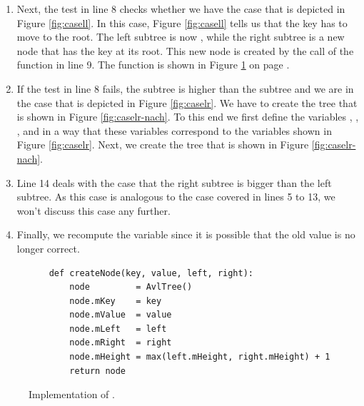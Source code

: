 \begin{enumerate}
      If the test in line 5 succeeds, then the left subtree must have a height that is bigger by
      two than the height of the right subtree.  In order to be able to use the same variable names 
      as the variable names given in the equations discussed in the previous subsection, we define
      the variables , , , , , , ,
      and  in lines 6 and 7 so that these variable names correspond exactly to the variable names
      used in the Figures \ref{fig:casell} and \ref{fig:caselr}.
\item Next, the test in line 8 checks whether we have the case that is depicted in Figure
      \ref{fig:casell}.  In this case, Figure \ref{fig:casell} tells us that the key 
      has to move to the root.  The left subtree is now , while the right subtree is a
      new node that has the key  at its root.  This new node is created by the call
      of the function  in line 9.  The function  is shown in
      Figure \ref{fig:avl-tree.ipython:createNode} on page \pageref{fig:avl-tree.ipython:createNode}.
\item If the test in line 8 fails, the subtree  is higher than the subtree  and we are in
      the case that is depicted in Figure \ref{fig:caselr}.  We have to create the tree that is
      shown in Figure \ref{fig:caselr-nach}.  To this end we first define the variables 
      , , , and  in a way that these variables
      correspond to the variables shown in Figure \ref{fig:caselr}.  Next, we create the tree
      that is shown in Figure \ref{fig:caselr-nach}.
\item Line 14 deals with the case that the right subtree is bigger than the left subtree. 
      As this case is analogous to the case covered in lines 5 to 13, we won't discuss this case
      any further.
\item Finally, we recompute the variable  since it is possible that the old value is
      no longer correct.
\end{enumerate}


\begin{figure}[!ht]
\centering
\begin{verbatim}
    def createNode(key, value, left, right):
        node         = AvlTree()
        node.mKey    = key
        node.mValue  = value
        node.mLeft   = left
        node.mRight  = right
        node.mHeight = max(left.mHeight, right.mHeight) + 1
        return node
\end{verbatim}
\vspace*{-0.3cm}
\caption{Implementation of .}
\label{fig:avl-tree.ipython:createNode}
\end{figure}

